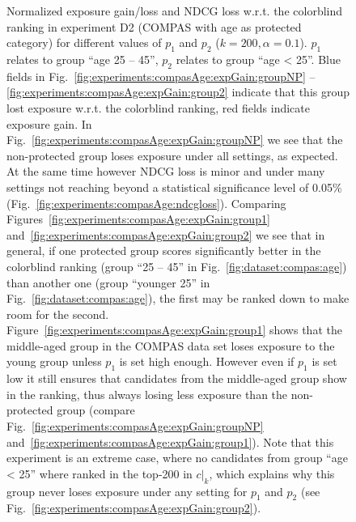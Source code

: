 \begin{figure}[t!]
	\vspace{-3mm}
	\caption{Normalized exposure gain/loss and NDCG loss w.r.t. the colorblind ranking in experiment D2 (COMPAS with age as protected category) for different values of $p_1$ and $p_2$ ($k=200, \alpha=0.1$).
		$p_1$ relates to group ``age 25 -- 45'', $p_2$ relates to group ``age < 25''.
		Blue fields in Fig.~\ref{fig:experiments:compasAge:expGain:groupNP} -- \ref{fig:experiments:compasAge:expGain:group2} indicate that this group lost exposure w.r.t. the colorblind ranking, red fields indicate exposure gain.
		In Fig.~\ref{fig:experiments:compasAge:expGain:groupNP} we see that the non-protected group loses exposure under all settings, as expected. 
		At the same time however NDCG loss is minor and under many settings not reaching beyond a statistical significance level of 0.05\% (Fig.~\ref{fig:experiments:compasAge:ndcgloss}).
		Comparing Figures~\ref{fig:experiments:compasAge:expGain:group1} and~\ref{fig:experiments:compasAge:expGain:group2} we see that in general, if one protected group scores significantly better in the colorblind ranking (group ``25 -- 45'' in Fig.~\ref{fig:dataset:compas:age}) than another one (group ``younger 25'' in Fig.~\ref{fig:dataset:compas:age}), the first may be ranked down to make room for the second.
		Figure~\ref{fig:experiments:compasAge:expGain:group1} shows that the middle-aged group in the COMPAS data set loses exposure to the young group unless $p_1$ is set high enough.
		However even if $p_1$ is set low it still ensures that candidates from the middle-aged group show in the ranking, thus always losing less exposure than the non-protected group (compare Fig.~\ref{fig:experiments:compasAge:expGain:groupNP} and~\ref{fig:experiments:compasAge:expGain:group1}).
		Note that this experiment is an extreme case, where no candidates from group ``age < 25'' where ranked in the top-200 in $c|_k$, which explains why this group never loses exposure under any setting for $p_1$ and $p_2$ (see Fig.~\ref{fig:experiments:compasAge:expGain:group2}).
	}
	\vspace{-\baselineskip}
	\label{fig:results-moving-p}
\end{figure}
